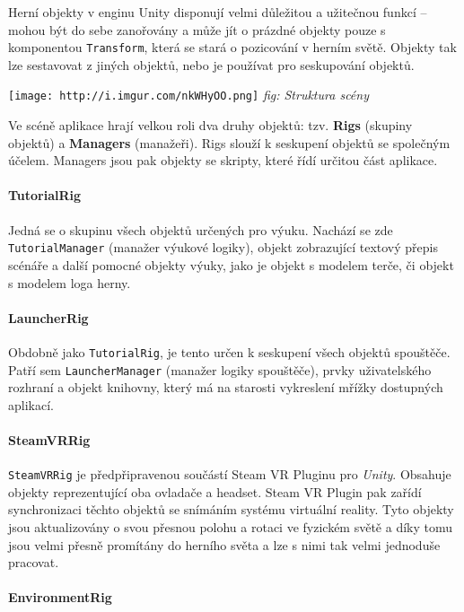 Herní objekty v enginu Unity disponují velmi důležitou a užitečnou
funkcí -- mohou být do sebe zanořovány a může jít o prázdné objekty
pouze s komponentou \texttt{Transform}, která se stará o pozicování v
herním světě. Objekty tak lze sestavovat z jiných objektů, nebo je
používat pro seskupování objektů.

\texttt{[image: http://i.imgur.com/nkWHyOO.png]} \emph{fig: Struktura
scény}

Ve scéně aplikace hrají velkou roli dva druhy objektů: tzv.
\textbf{Rigs} (skupiny objektů) a \textbf{Managers} (manažeři). Rigs
slouží k seskupení objektů se společným účelem. Managers jsou pak
objekty se skripty, které řídí určitou část aplikace.

\paragraph{TutorialRig}\label{tutorialrig}

Jedná se o skupinu všech objektů určených pro výuku. Nachází se zde
\texttt{TutorialManager} (manažer výukové logiky), objekt zobrazující textový přepis scénáře a
další pomocné objekty výuky, jako je objekt s modelem terče, či objekt s
modelem loga herny.

\paragraph{LauncherRig}\label{launcherrig}

Obdobně jako \texttt{TutorialRig}, je tento určen k seskupení všech
objektů spouštěče. Patří sem \texttt{LauncherManager} (manažer logiky spouštěče), prvky
uživatelského rozhraní a objekt knihovny, který má na starosti
vykreslení mřížky dostupných aplikací.

\paragraph{SteamVRRig}\label{steamvrrig}

\texttt{SteamVRRig} je předpřipravenou součástí Steam VR Pluginu pro
\emph{Unity}. Obsahuje objekty reprezentující oba ovladače a headset.
Steam VR Plugin pak zařídí synchronizaci těchto objektů se snímáním
systému virtuální reality. Tyto objekty jsou aktualizovány o svou
přesnou polohu a rotaci ve fyzickém světě a díky tomu jsou velmi přesně
promítány do herního světa a lze s nimi tak velmi jednoduše pracovat.

\paragraph{EnvironmentRig}\label{environmentrig}

